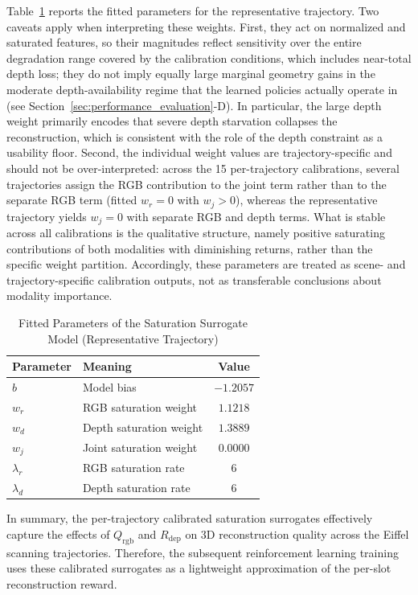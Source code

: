 \documentclass[journal]{IEEEtran}
\begin{document}
Table~\ref{tab:saturation_surrogate_parameters} reports the fitted parameters for the representative trajectory. Two caveats apply when interpreting these weights. First, they act on normalized and saturated features, so their magnitudes reflect sensitivity over the entire degradation range covered by the calibration conditions, which includes near-total depth loss; they do not imply equally large marginal geometry gains in the moderate depth-availability regime that the learned policies actually operate in (see Section~\ref{sec:performance_evaluation}-D). In particular, the large depth weight primarily encodes that severe depth starvation collapses the reconstruction, which is consistent with the role of the depth constraint as a usability floor. Second, the individual weight values are trajectory-specific and should not be over-interpreted: across the 15 per-trajectory calibrations, several trajectories assign the RGB contribution to the joint term rather than to the separate RGB term (fitted $w_r=0$ with $w_j>0$), whereas the representative trajectory yields $w_j=0$ with separate RGB and depth terms. What is stable across all calibrations is the qualitative structure, namely positive saturating contributions of both modalities with diminishing returns, rather than the specific weight partition. Accordingly, these parameters are treated as scene- and trajectory-specific calibration outputs, not as transferable conclusions about modality importance.

\begin{table}[t]
\centering
\caption{Fitted Parameters of the Saturation Surrogate Model (Representative Trajectory)}
\label{tab:saturation_surrogate_parameters}
\begin{tabular}{l l c}
\hline
Parameter & Meaning & Value \\
\hline
$b$ & Model bias & $-1.2057$ \\
$w_r$ & RGB saturation weight & $1.1218$ \\
$w_d$ & Depth saturation weight & $1.3889$ \\
$w_j$ & Joint saturation weight & $0.0000$ \\
$\lambda_r$ & RGB saturation rate & $6$ \\
$\lambda_d$ & Depth saturation rate & $6$ \\
\hline
\end{tabular}
\end{table}

In summary, the per-trajectory calibrated saturation surrogates effectively capture the effects of $Q_{\mathrm{rgb}}$ and $R_{\mathrm{dep}}$ on 3D reconstruction quality across the Eiffel scanning trajectories. Therefore, the subsequent reinforcement learning training uses these calibrated surrogates as a lightweight approximation of the per-slot reconstruction reward.
\end{document}
